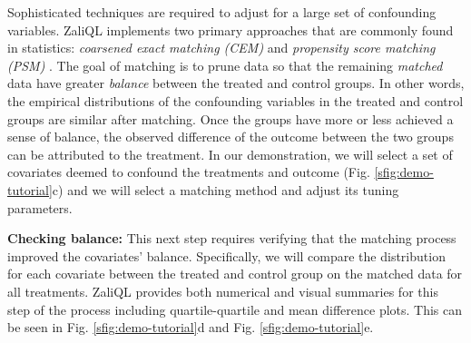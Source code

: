 Sophisticated techniques are required to adjust for a large set of confounding variables. ZaliQL implements two primary approaches that are commonly found in statistics: {\em coarsened exact matching (CEM)} and {\em propensity score matching (PSM)} \cite{IacKinPor09,Rubin1983b}. The goal of matching is to prune data so that the remaining {\em matched} data have greater {\em balance} between the treated and control groups. In other words, the empirical distributions of the confounding variables in the treated and control groups are similar after matching. Once the groups have more or less achieved a sense of balance, the observed difference of the outcome between the two groups can be attributed to the treatment. In our demonstration, we will select a set of covariates deemed to confound the treatments and outcome (Fig. \ref{sfig:demo-tutorial}c) and we will select a matching method and adjust its tuning parameters.

{\bf Checking balance:} This next step requires verifying that the matching process improved the covariates’ balance. Specifically, we will compare the distribution for each covariate between the treated and control group on the matched data for all treatments. ZaliQL provides both numerical and visual summaries for this step of the process including quartile-quartile and mean difference plots. This can be seen in Fig. \ref{sfig:demo-tutorial}d and Fig. \ref{sfig:demo-tutorial}e.

